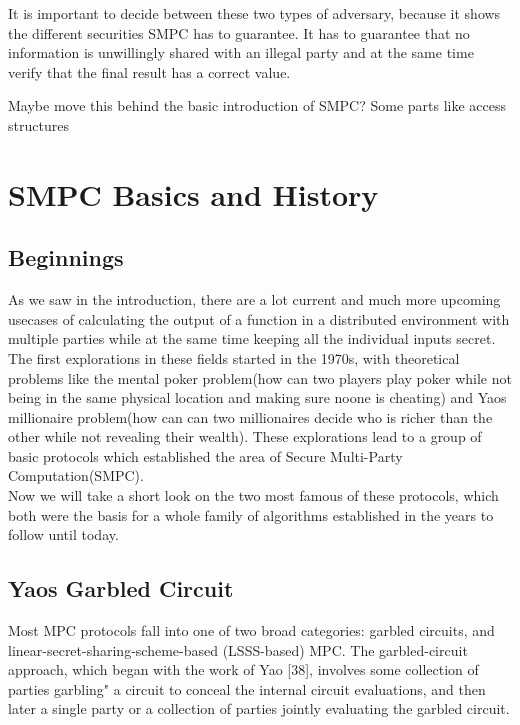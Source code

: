 \documentclass[english,runningheads,a4paper]{llncs}[2018/03/10]
\begin{document}
It is important to decide between these two types of adversary, because it shows the different securities SMPC has to guarantee. It has to guarantee that no information is unwillingly shared with an illegal party and at the same time verify that the final result has a correct value.


Maybe move this behind the basic introduction of SMPC? Some parts like access structures 



\section{SMPC Basics and History}\label{sec:smpc}
\subsection{Beginnings}
As we saw in the introduction, there are a lot current and much more upcoming usecases of calculating the output of a function in a distributed environment with multiple parties while at the same time keeping all the individual inputs secret. The first explorations in these fields started in the 1970s, with theoretical problems like the mental poker problem(how can two players play poker while not being in the same physical location and making sure noone is cheating) and Yaos millionaire problem(how can can two millionaires decide who is richer than the other while not revealing their wealth). \newline
These explorations lead to a group of basic protocols which established the area of Secure Multi-Party Computation(SMPC).\\
 Now we will take a short look on the two most famous of these protocols, which both were the basis for a whole family of algorithms established in the years to follow until today.

\subsection{Yaos Garbled Circuit}

Most MPC protocols fall into one of two broad categories: garbled circuits,
and linear-secret-sharing-scheme-based (LSSS-based) MPC. The garbled-circuit
approach, which began with the work of Yao [38], involves some collection of
parties garbling" a circuit to conceal the internal circuit evaluations, and then
later a single party or a collection of parties jointly evaluating the garbled circuit.
\end{document}

